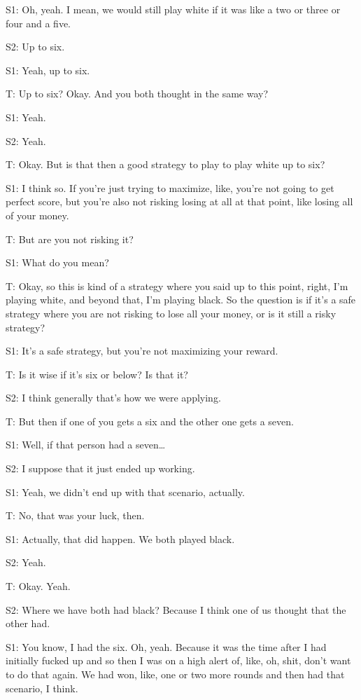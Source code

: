 S1: Oh, yeah. I mean, we would still play white if it was like a two or three or four and a five.

S2: Up to six. 

S1: Yeah, up to six. 

T: Up to six? Okay. And you both thought in the same way?

S1: Yeah. 

S2: Yeah.

T: Okay. But is that then a good strategy to play to play white up to six? 

S1: I think so. If you're just trying to maximize, like, you're not going to get perfect score, but you're also not risking losing at all at that point, like losing all of your money.

T: But are you not risking it? 

S1: What do you mean? 

T: Okay, so this is kind of a strategy where you said up to this point, right, I'm playing white, and beyond that, I'm playing black. So the question is if it’s a safe strategy where you are not risking to lose all your money, or is it still a risky strategy? 

S1: It's a safe strategy, but you're not maximizing your reward.

T: Is it wise if it's six or below? Is that it?

S2: I think generally that’s how we were applying. 

T: But then if one of you gets a six and the other one gets a seven. 

S1: Well, if that person had a seven…

S2: I suppose that it just ended up working.

S1: Yeah, we didn't end up with that scenario, actually. 

T: No, that was your luck, then. 

S1: Actually, that did happen. We both played black. 

S2: Yeah. 

T: Okay. Yeah. 

S2: Where we have both had black? Because I think one of us thought that the other had.

S1: You know, I had the six. Oh, yeah. Because it was the time after I had initially fucked up and so then I was on a high alert of, like, oh, shit, don't want to do that again. We had won, like, one or two more rounds and then had that scenario, I think. 


